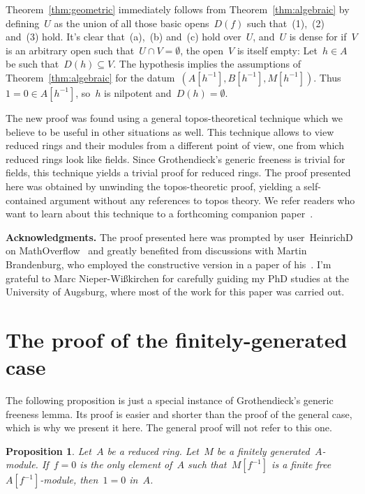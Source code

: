 \documentclass{amsart}
\theoremstyle{definition}
\theoremstyle{plain}
\newtheorem{prop}[defn]{Proposition}
\theoremstyle{remark}
\begin{document}
Theorem~\ref{thm:geometric} immediately follows from
Theorem~\ref{thm:algebraic} by defining~$U$ as the union of all those basic
opens~$D(f)$ such that~(1),~(2) and~(3) hold. It's clear that~(a),~(b)
and~(c) hold over~$U$, and~$U$ is dense for if~$V$ is an arbitrary open
such that~$U \cap V = \emptyset$, the open~$V$ is itself empty: Let~$h \in A$ be
such that~$D(h) \subseteq V$. The hypothesis implies the assumptions of
Theorem~\ref{thm:algebraic} for the datum~$(A[h^{-1}], B[h^{-1}], M[h^{-1}])$.
Thus~$1 = 0 \in A[h^{-1}]$, so~$h$ is nilpotent and~$D(h) = \emptyset$.

The new proof was found using a general topos-theoretical technique which we
believe to be useful in other situations as well. This technique allows to view
reduced rings and their modules from a different point of view, one from which
reduced rings look like fields. Since Grothendieck's generic freeness
is trivial for fields, this technique yields a trivial proof for reduced rings.
The proof presented here was obtained by unwinding the topos-theoretic proof,
yielding a self-contained argument without any references to topos theory.
We refer readers who want to learn about this technique to a forthcoming companion 
paper~\cite{blechschmidt:wlog}.

\textbf{Acknowledgments.} The proof presented here was prompted by
user~HeinrichD on MathOverflow~\cite{mo:kernel} and greatly
benefited from discussions with Martin Brandenburg, who employed the constructive
version in a paper of his~\cite{brandenburg:schur}. I'm grateful to Marc
Nieper-Wißkirchen for carefully guiding my PhD studies at the University of
Augsburg, where most of the work for this paper was carried out.


\section{The proof of the finitely-generated case}

The following proposition is just a special instance of Grothendieck's generic
freeness lemma. Its proof is easier and shorter than the proof of the general
case, which is why we present it here. The general proof
will not refer to this one.

\begin{prop}Let~$A$ be a reduced ring. Let~$M$ be a finitely
generated~$A$-module. If~$f = 0$ is the only element of~$A$ such
that~$M[f^{-1}]$ is a finite free~$A[f^{-1}]$-module, then~$1 = 0$ in~$A$.
\end{prop}
\end{document}
